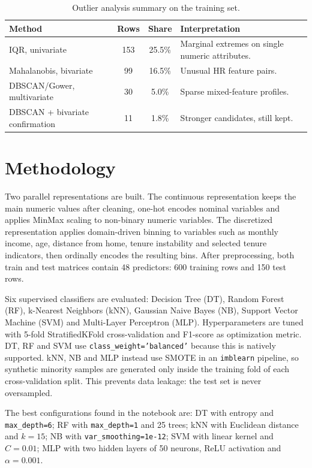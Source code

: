 \documentclass[lettersize,journal]{IEEEtran}
\begin{document}
\begin{table}[t]
\caption{Outlier analysis summary on the training set.}
\label{tab:outliers}
\centering
\scriptsize
\setlength{\tabcolsep}{3pt}
\begin{tabular}{lccp{}}
\toprule
Method & Rows & Share & Interpretation \\
\midrule
IQR, univariate & 153 & 25.5\% & Marginal extremes on single numeric attributes. \\
Mahalanobis, bivariate & 99 & 16.5\% & Unusual HR feature pairs. \\
DBSCAN/Gower, multivariate & 30 & 5.0\% & Sparse mixed-feature profiles. \\
DBSCAN + bivariate confirmation & 11 & 1.8\% & Stronger candidates, still kept. \\
\bottomrule
\end{tabular}
\end{table}

\section{Methodology}
Two parallel representations are built. The continuous representation keeps the main numeric values after cleaning, one-hot encodes nominal variables and applies MinMax scaling to non-binary numeric variables. The discretized representation applies domain-driven binning to variables such as monthly income, age, distance from home, tenure instability and selected tenure indicators, then ordinally encodes the resulting bins. After preprocessing, both train and test matrices contain 48 predictors: 600 training rows and 150 test rows.

Six supervised classifiers are evaluated: Decision Tree (DT), Random Forest (RF), k-Nearest Neighbors (kNN), Gaussian Naive Bayes (NB), Support Vector Machine (SVM) and Multi-Layer Perceptron (MLP). Hyperparameters are tuned with 5-fold StratifiedKFold cross-validation and F1-score as optimization metric. DT, RF and SVM use \texttt{class\_weight='balanced'} because this is natively supported. kNN, NB and MLP instead use SMOTE in an \texttt{imblearn} pipeline, so synthetic minority samples are generated only inside the training fold of each cross-validation split. This prevents data leakage: the test set is never oversampled.

The best configurations found in the notebook are: DT with entropy and \texttt{max\_depth=6}; RF with \texttt{max\_depth=1} and 25 trees; kNN with Euclidean distance and $k=15$; NB with \texttt{var\_smoothing=1e-12}; SVM with linear kernel and $C=0.01$; MLP with two hidden layers of 50 neurons, ReLU activation and $\alpha=0.001$.
\end{document}
